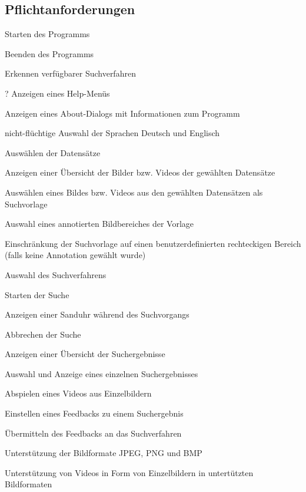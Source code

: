 \subsection{Pflichtanforderungen}
\begin{description}
	\item[] Starten des Programms
	\item[] Beenden des Programms
	\item[] Erkennen verfügbarer Suchverfahren
	\item[] ? Anzeigen eines Help-Menüs
	\item[] Anzeigen eines About-Dialogs mit Informationen zum Programm
	\item[] nicht-flüchtige Auswahl der Sprachen Deutsch und Englisch
	\newline
	\item[] Ausw\"ahlen der Datens\"atze
	\item[] Anzeigen einer Übersicht der Bilder bzw. Videos der gewählten Datensätze
	\item[] Ausw\"ahlen eines Bildes bzw. Videos aus den gewählten Datensätzen als Suchvorlage
	\item[] Auswahl eines annotierten Bildbereiches der Vorlage
	\item[] Einschränkung der Suchvorlage auf einen benutzerdefinierten rechteckigen Bereich (falls keine Annotation gewählt wurde)
	\item[] Auswahl des Suchverfahrens
	\newline
	\item[] Starten der Suche
	\item[] Anzeigen einer Sanduhr während des Suchvorgangs
	\item[] Abbrechen der Suche
	\newline
	\item[] Anzeigen einer \"Ubersicht der Suchergebnisse
	\item[] Auswahl und Anzeige eines einzelnen Suchergebnisses
	\item[] Abspielen eines Videos aus Einzelbildern
	\item Einstellen eines Feedbacks zu einem Suchergebnis
	\item[\req{F 200}] \"Ubermitteln des Feedbacks an das Suchverfahren
	\newline
	\item[\req{F 210}] Unterstützung der Bildformate JPEG, PNG und BMP
	\item[\req{F 220}] Unterstützung von Videos in Form von Einzelbildern in untert\"utzten Bildformaten
\end{description}


